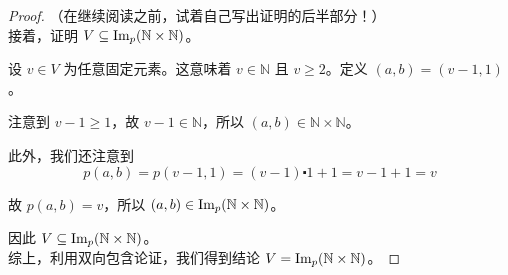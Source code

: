 \begin{example}
\begin{proof}
        （在继续阅读之前，试着自己写出证明的后半部分！）\\

        接着，证明 $V \subseteq \text{Im}_p(\mathbb{N} \times \mathbb{N})$。

        设 $v \in V$ 为任意固定元素。这意味着 $v \in \mathbb{N}$ 且 $v \ge 2$。定义 $(a, b) = (v - 1, 1)$。

        注意到 $v - 1 \ge 1$，故 $v-1 \in \mathbb{N}$，所以 $(a, b) \in \mathbb{N} \times \mathbb{N}$。

        此外，我们还注意到
        \[p(a, b) = p(v - 1, 1) = (v - 1) \centerdot 1 + 1 = v - 1 + 1 = v\]
        
        故 $p(a, b) = v$，所以 $(a,b) \in \text{Im}_p(\mathbb{N} \times \mathbb{N})$。
        
        因此 $V \subseteq \text{Im}_p(\mathbb{N} \times \mathbb{N})$。\\

        综上，利用双向包含论证，我们得到结论 $V = \text{Im}_p(\mathbb{N} \times \mathbb{N})$。
    \end{proof}
\end{example}